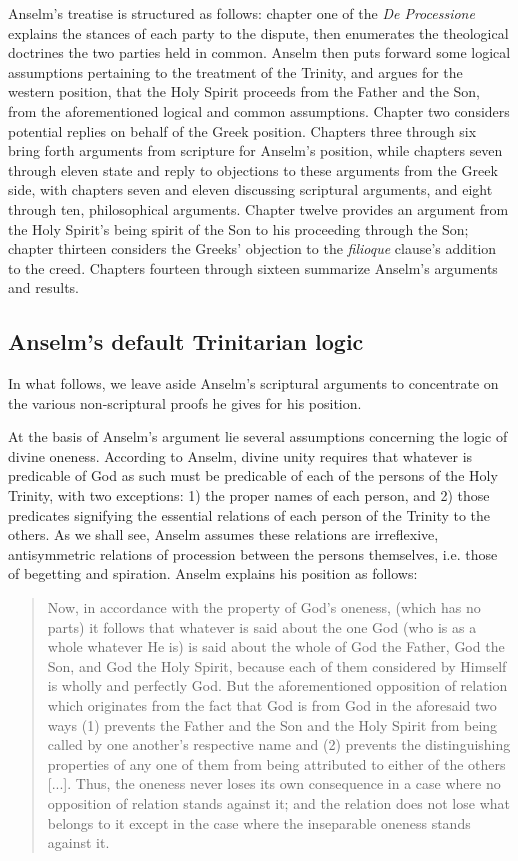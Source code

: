 \documentclass[]{article}
\begin{document}
Anselm's treatise is structured as follows: chapter one of the \textit{De Processione} explains the stances of each party to the dispute, then enumerates the theological doctrines  the two parties held in common. Anselm then puts forward some logical assumptions pertaining to the treatment of the Trinity, and argues for the western position, that the Holy Spirit proceeds from the Father and the Son, from the aforementioned logical and common assumptions. Chapter two considers potential replies on behalf of the Greek position. Chapters three through six bring forth arguments from scripture for Anselm's position, while chapters seven through eleven state and reply to objections to these arguments from the Greek side, with chapters seven and eleven discussing scriptural arguments, and eight through ten, philosophical arguments. Chapter twelve provides an argument from the Holy Spirit's being spirit of the Son to his proceeding through the Son; chapter thirteen considers the Greeks' objection to the \textit{filioque} clause's addition to the creed. Chapters fourteen through sixteen summarize Anselm's arguments and results.

\subsection{Anselm's default Trinitarian logic}
In what follows, we leave aside Anselm's scriptural arguments to concentrate on the various non-scriptural proofs he gives for his position. 

At the basis of Anselm's argument lie several assumptions concerning the logic of divine oneness. According to Anselm, divine unity requires that whatever is predicable of God as such must be predicable of each of the persons of the Holy Trinity, with two exceptions: 1) the proper names of each person, and 2) those predicates signifying the essential relations of each person of the Trinity to the others. As we shall see, Anselm assumes these relations are irreflexive, antisymmetric relations of procession between the persons themselves, i.e. those of begetting and spiration. Anselm explains his position as follows:

\begin{quote}
	Now, in accordance with the property of God's oneness, (which has no parts) it follows that whatever is said about the one God (who is as a whole whatever He is) is said about the whole of God the Father, God the Son, and God the Holy Spirit, because each of them considered by Himself is wholly and perfectly God. But the aforementioned opposition of relation which originates from the fact that God is from God in the aforesaid two ways (1) prevents the Father and the Son and the Holy Spirit from being called by one another's respective name and (2) prevents the distinguishing properties of any one of them from being attributed to either of the others [...]. Thus, the oneness never loses its own consequence in a case where no opposition of relation stands against it; and the relation does not lose what belongs to it except in the case where the inseparable oneness stands against it.\autocite[469-470]{AnselmDeProc}
\end{quote}
\end{document}
